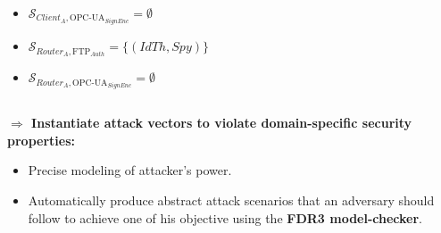 \documentclass{beamer}
\newcommand{\ftpauth}{FTP$_{Auth}$\xspace}
\newcommand{\opcuasignenc}{OPC-UA$_{SignEnc}$\xspace}
\begin{document}
\begin{frame}[fragile]{}
\begin{tcolorbox}[adjusted title={\centering\large Attack models}]
\begin{columns}[T]
\begin{column}{.65\textwidth}
\begin{tcolorbox}
\begin{columns}[c]
\begin{column}{.4\textwidth}
\begin{itemize}
                                \item $\mathcal{S}_{Client_{A},\text{\opcuasignenc}} = \emptyset$
                                \item $\mathcal{S}_{Router_{A},\text{\ftpauth}} = \{ (IdTh, Spy) \}$
                                \item $\mathcal{S}_{Router_{A},\text{\opcuasignenc}} = \emptyset$
                            \end{itemize}
                        \end{column}
                    \end{columns}
               \end{tcolorbox}
            \end{column}
        \end{columns}
    \end{tcolorbox}
    \vspace{.25em}
    \begin{tcolorbox}[adjusted title={\centering\large Smart-Fuzzing of Industrial Systems}]
        \vspace{.5em}
        \begin{columns}[T]
            \begin{column}{.35\textwidth}
                \begin{tcolorbox}[
                colback=white, %
                colframe=normalTitleBlockColor, %
                colframe=gray!20, %
                boxrule=1mm,
                coltext=black, %
                coltitle=black, %
                bottom=2mm,
                equal height group=C,
                valign = center,
                adjusted title={\large Objectives}]
                    \vspace{.5em}
                    {\bf $\Rightarrow$ Instantiate attack vectors to violate domain-specific security properties:}
                    \begin{itemize}
                        \item Precise modeling of attacker's power.
                        \vspace{.5em}
                        \item Automatically produce abstract attack scenarios that an adversary should follow to achieve one of his objective using the {\bf FDR3 model-checker}.
                        \vspace{.5em}

\end{itemize}
\end{tcolorbox}
\end{column}
\end{columns}
\end{tcolorbox}
\end{frame}
\end{document}
